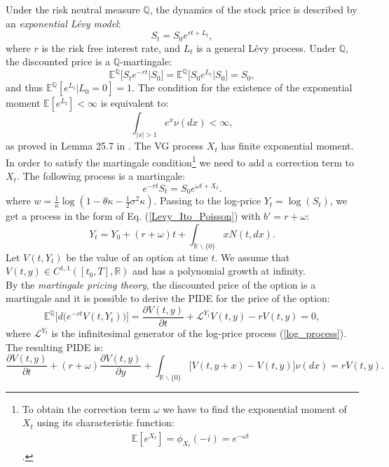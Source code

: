 \documentclass[]{interact}
\newcommand{\numberset}{\mathbb}
\newcommand{\R}{\numberset{R}}
\newcommand{\E}{\numberset{E}}
\newcommand{\Q}{\numberset{Q}}
\newcommand{\LL}{\mathcal{L}}
\theoremstyle{plain}%
\theoremstyle{definition}
\theoremstyle{remark}
\begin{document}
Under the risk neutral measure $\Q$, the dynamics of the stock price is described by an \emph{exponential Lévy model}:
\begin{equation}
 S_t = S_0 e^{rt + L_t},
\end{equation}
where $r$ is the risk free interest rate, and $L_t$ is a general Lévy process.
Under $\Q$, the discounted price is a $\Q$-martingale:
\begin{equation}
 \E^{\Q} \bigl[ S_te^{-rt} \bigr| S_0 \bigr] =  \E^{\Q} \bigl[ S_0e^{L_t} \bigr| S_0 \bigr] = S_0, 
\end{equation}
and thus $\E^{\Q}[ e^{L_t} | L_0=0] = 1 $.
The condition for the existence of the exponential moment $\E[ e^{L_t}] < \infty$ is equivalent to:  
\begin{equation}
 \int_{|x|>1} e^x \nu(dx) < \infty,
\end{equation}
as proved in Lemma 25.7 in \cite{Sato}. The VG process $X_t$ has finite exponential moment.
In order to satisfy the martingale condition\footnote{
To obtain the correction term $\omega$ we have to find the exponential moment of $X_t$ using its characteristic function: 
\begin{align*}
\E[ e^{X_t}] = \phi_{X_t}(-i) = e^{-\omega t}
 \end{align*}.} we need to add a correction term to $X_t$. 
The following process is a martingale:
\begin{equation}\label{S_pprocess}
 e^{-rt}S_t = S_0 e^{\omega t + X_t}.
\end{equation}
where $w = \frac{1}{\kappa} \log(1-\theta \kappa -\frac{1}{2}\sigma^2 \kappa)$.
Passing to the log-price $Y_t = \log(S_t)$, we get a process in the form of Eq. (\ref{Levy_Ito_Poisson}) with $b' = r + \omega$:
\begin{equation}\label{log_process}
 Y_t = Y_0 + (r+\omega)t + \int_{\R \backslash \{0\}} x N(t,dx).
\end{equation}
Let $V(t,Y_t)$ be the value of an option at time $t$. 
We assume that $V(t,y) \in C^{1,1}([t_0,T],\R)$ and has a polynomial growth at infinity.\\ 
By the \emph{martingale pricing theory}, the discounted price of the option
is a martingale and it is possible to derive the PIDE for the price of the option:
\begin{equation}
 \E^{\Q}\biggl[ d\bigl( e^{-rt}V(t,Y_t) \bigr)\biggr] = \frac{\partial V(t,y)}{\partial t} + \LL^{Y_t} V(t,y) -r V(t,y) = 0,   
\end{equation}
where $\LL^{Y_t}$ is the infinitesimal generator of the log-price process (\ref{log_process}). 
The resulting PIDE is:
\begin{equation} \label{VG_PIDE}
 \frac{\partial V(t,y)}{\partial t} + (r+\omega) \frac{\partial V(t,y)}{\partial y}
 + \int_{\R \backslash \{0\}} \bigl[ V(t,y+x) - V(t,y) \bigr] \nu(dx) = rV(t,y) .
\end{equation}
\end{document}
